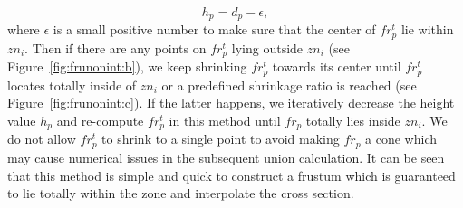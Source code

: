 \begin{equation}
\label{eq:frheight}
h_p = d_p- \epsilon,
\end{equation}
where $\epsilon$ is a small positive number to make sure that the
center of $fr_p^t$ lie within $zn_i$. Then if there are any points
on $fr_p^t$ lying outside $zn_i$ (see Figure~\ref{fig:frunonint:b}),
we keep shrinking $fr_p^t$ towards its center until $fr_p^t$ locates
totally inside of $zn_i$ or a predefined shrinkage ratio is reached
(see Figure~\ref{fig:frunonint:c}). If the latter happens, we
iteratively decrease the height value $h_p$ and re-compute $fr_p^t$
in this method until $fr_p$ totally lies inside $zn_i$. We do not
allow $fr_p^t$ to shrink to a single point to avoid making $fr_p$ a
cone which may cause numerical issues in the subsequent union
calculation. It can be seen that this method is simple and quick to
construct a frustum which is guaranteed to lie totally within the
zone and interpolate the cross section.


